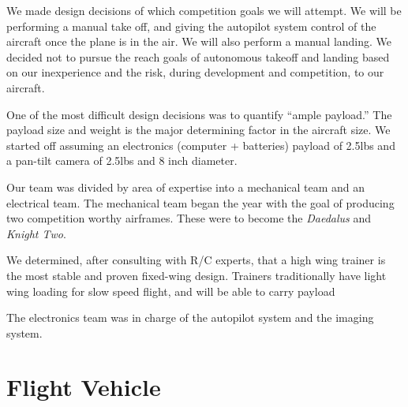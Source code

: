 \documentclass[10pt]{report}
\begin{document}
We made design decisions of which competition goals we will attempt. 
We will be performing a manual take off, and giving the autopilot system control of the aircraft once the plane is in the air. We will also perform a manual landing. We decided not to pursue the reach goals of autonomous takeoff and landing based on our inexperience and the risk, during development and competition, to our aircraft.

One of the most difficult design decisions was to quantify ``ample payload.'' The payload size and weight is the major determining factor in the aircraft size.
We started off assuming an electronics (computer + batteries) payload of 2.5lbs and a pan-tilt camera of 2.5lbs and 8 inch diameter.


Our team was divided by area of expertise into a mechanical team and an electrical team.
The mechanical team began the year with the goal of producing two competition worthy airframes. These were to become the \emph{Daedalus} and \emph{Knight Two}.

We determined, after consulting with R/C experts, that a high wing trainer is the most stable and proven fixed-wing design. Trainers traditionally have light wing loading for slow speed flight, and will be able to carry payload 



The electronics team was in charge of the autopilot system and the imaging system. 

\section{Flight Vehicle}
\end{document}
